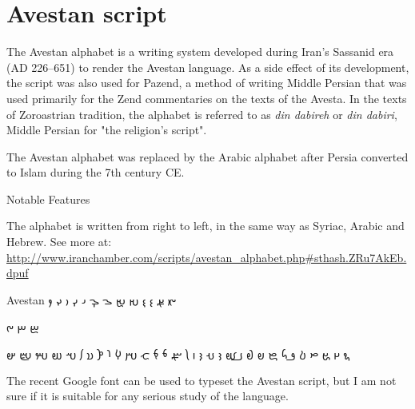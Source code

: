 

\section{Avestan script}
\label{s:avestan}
The Avestan alphabet is a writing system developed during Iran's Sassanid era (AD 226–651) to render the Avestan language.
As a side effect of its development, the script was also used for Pazend, a method of writing Middle Persian that was used primarily for the Zend commentaries on the texts of the Avesta. In the texts of Zoroastrian tradition, the alphabet is referred to as \emph{din dabireh} or \emph{din dabiri}, Middle Persian for "the religion's script".

The Avestan alphabet was replaced by the Arabic alphabet after Persia converted to Islam during the 7th century CE. 


Notable Features

The alphabet is written from right to left, in the same way as Syriac, Arabic and Hebrew.
See more at: \url{http://www.iranchamber.com/scripts/avestan_alphabet.php#sthash.ZRu7AkEb.dpuf}


\begin{scriptexample}[]{Avestan}
\ifxetex{}
\beginR\fi
\avestan\raggedleft
𐬄	
𐬅	
𐬆	
𐬇	
𐬈	
𐬉	
𐬊	
𐬋	
𐬌	
𐬍	
𐬎	
𐬏	
𐬐	
	
𐬒	
𐬓	
𐬔	
	
𐬖	
𐬗	
𐬘	
𐬙	
𐬚	
𐬛	
𐬜	
𐬝	
𐬞	
𐬟	
𐬠	
𐬡	
𐬢	
𐬣	
𐬤	
𐬥	
𐬦	
𐬧	
𐬨	
𐬩	
𐬪	
𐬫	
𐬬	
𐬭	
𐬮	
𐬯	
𐬰	
𐬱	
𐬲	
𐬳	
𐬴	
𐬵	
\ifxetex\endR
{}\fi
\end{scriptexample}

The recent Google font  can be used to typeset the Avestan script, but I am not sure if it is suitable for any serious study of the language.